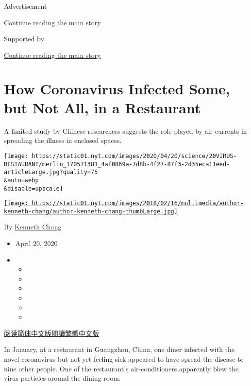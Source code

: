Advertisement

\protect\hyperlink{after-top}{Continue reading the main story}

Supported by

\protect\hyperlink{after-sponsor}{Continue reading the main story}

\hypertarget{how-coronavirus-infected-some-but-not-all-in-a-restaurant}{%
\section{How Coronavirus Infected Some, but Not All, in a
Restaurant}\label{how-coronavirus-infected-some-but-not-all-in-a-restaurant}}

A limited study by Chinese researchers suggests the role played by air
currents in spreading the illness in enclosed spaces.

\texttt{[image: https://static01.nyt.com/images/2020/04/20/science/20VIRUS-RESTAURANT/merlin\_170571381\_4af0869a-7d8b-4f27-87f3-2d35eca11eed-articleLarge.jpg?quality=75\\\&auto=webp\\\&disable=upscale]}

\href{https://www.nytimes.com/by/kenneth-chang}{\texttt{[image: https://static01.nyt.com/images/2018/02/16/multimedia/author-kenneth-chang/author-kenneth-chang-thumbLarge.jpg]}}

By \href{https://www.nytimes.com/by/kenneth-chang}{Kenneth Chang}

\begin{itemize}
\item
  April 20, 2020
\item
  \begin{itemize}
  \item
  \item
  \item
  \item
  \item
  \item
  \end{itemize}
\end{itemize}

\href{https://cn.nytimes.com/health/20200421/airflow-coronavirus-restaurants/}{阅读简体中文版}\href{https://cn.nytimes.com/health/20200421/airflow-coronavirus-restaurants/zh-hant/}{閱讀繁體中文版}

In January, at a restaurant in Guangzhou, China, one diner infected with
the novel coronavirus but not yet feeling sick appeared to have spread
the disease to nine other people. One of the restaurant's
air-conditioners apparently blew the virus particles around the dining
room.

